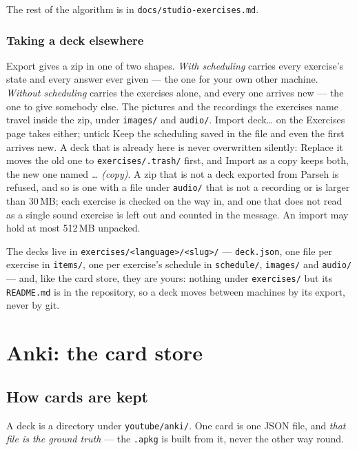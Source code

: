 \documentclass[11pt,oneside]{report}
\newcommand{\file}[1]{\texttt{#1}}
\newcommand{\menu}[1]{\textsf{#1}}
\begin{document}
\noindent The rest of the algorithm is in \file{docs/studio-exercises.md}.

\subsection*{Taking a deck elsewhere}

\menu{Export} gives a zip in one of two shapes. \emph{With scheduling}
carries every exercise's state and every answer ever given --- the one for
your own other machine. \emph{Without scheduling} carries the exercises
alone, and every one arrives new --- the one to give somebody else.
The pictures and the recordings the exercises name travel inside the zip,
under \file{images/} and \file{audio/}.
\menu{Import deck\ldots} on the Exercises page takes either; untick
\menu{Keep the scheduling saved in the file} and even the first arrives new.
A deck that is already here is never overwritten silently: \menu{Replace it}
moves the old one to \file{exercises/.trash/} first, and \menu{Import as a
copy} keeps both, the new one named \emph{\ldots{} (copy)}. A zip that is not
a deck exported from Parseh is refused, and so is one with a file under
\file{audio/} that is not a recording or is larger than 30\,MB; each exercise
is checked on the way in, and one that does not read as a single sound
exercise is left out and counted in the message. An import may hold at most
512\,MB unpacked.

\begin{goodbox}
The decks live in \file{exercises/<language>/<slug>/} --- \file{deck.json},
one file per exercise in \file{items/}, one per exercise's schedule in
\file{schedule/}, \file{images/} and \file{audio/} --- and, like the card store, they are
yours: nothing under \file{exercises/} but its \file{README.md} is in the
repository, so a deck moves between machines by its export, never by git.
\end{goodbox}

\chapter{Anki: the card store}
\label{ch:store}

\section{How cards are kept}

A deck is a directory under \file{youtube/anki/}. One card is one JSON file,
and \emph{that file is the ground truth} --- the \file{.apkg} is built from
it, never the other way round.
\end{document}
